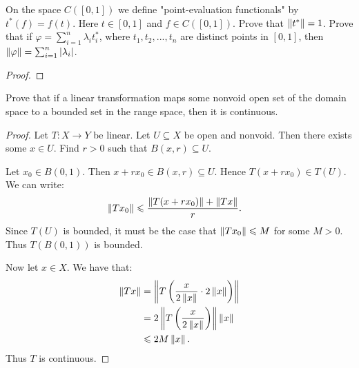 \begin{exercise}
On the space $C([0,1])$ we define "point-evaluation functionals" by $t^\ast(f) = f(t)$. Here $t \in [0,1]$ and $f \in C([0,1])$. Prove that $\left\lVert t^\ast \right\rVert = 1$. Prove that if $\varphi = \sum_{i = 1}^n \lambda_i t_i^\ast$, where $t_1,t_2,...,t_n$ are distinct points in $[0,1]$, then $\left\lVert \varphi \right\rVert = \sum_{i = 1}^n |\lambda_i|$.
\end{exercise}
    {\color{red} \begin{proof}
    
    \end{proof}}

\begin{exercise}
Prove that if a linear transformation maps some nonvoid open set of the domain space
to a bounded set in the range space, then it is continuous.
\end{exercise}
    \begin{proof}
        Let $T:X \rightarrow Y$ be linear. Let $U \subseteq X$ be open and nonvoid. Then there exists some $x \in U$. Find $r > 0$ such that $B(x,r) \subseteq U$. 

        Let $x_0 \in B(0,1)$. Then $x+rx_0 \in B(x,r) \subseteq U$. Hence $T(x + rx_0) \in T(U)$. We can write:
            \begin{equation*}
            \begin{split}
                \left\lVert T x_0 \right\rVert
                & \leqslant \frac{\left\lVert T(x+rx_0) \right\rVert + \left\lVert Tx  \right\rVert}{r}.
            \end{split}
            \end{equation*}
        Since $T(U)$ is bounded, it must be the case that $\left\lVert T x_0 \right\rVert \leqslant M$ for some $M > 0$. Thus $T(B(0,1))$ is bounded.

        Now let $x \in X$. We have that:
            \begin{equation*}
            \begin{split}
                \left\lVert T x \right\rVert
                & = \left\lVert T \left( \frac{x}{2 \left\lVert x \right\rVert} \cdot 2 \left\lVert x \right\rVert \right) \right\rVert \\
                & = 2 \left\lVert T \left( \frac{x}{2 \left\lVert x \right\rVert} \right) \right\rVert \left\lVert  x \right\rVert \\
                & \leqslant 2 M \left\lVert x \right\rVert.
            \end{split}
            \end{equation*}
        Thus $T$ is continuous.
    \end{proof}


